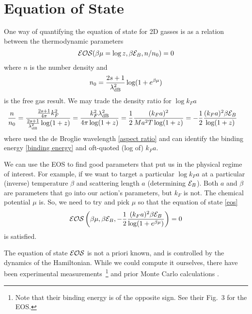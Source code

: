 \section{Equation of State}\label{sec:eos}

One way of quantifying the equation of state for 2D gasses is as a relation between the thermodynamic parameters
\begin{align}
    \mathcal{E}\mathcal{O}\mathcal{S}(\beta \mu = \log z, \beta \mathcal{E}_B, n/n_0) = 0
    \label{eq:eos}
\end{align}
where $n$ is the number density and 
\begin{align}
    n_0 = \frac{2s+1}{\lambda_{\text{dB}}^2} \log(1+e^{\beta\mu})
\end{align} is the free gas result.
We may trade the density ratio for $\log k_F a$
\begin{align}
    \frac{n}{n_0}
    &=
    \frac{\frac{2s+1}{4\pi} k_F^2}{\frac{2s+1}{\lambda_{\text{dB}}^2} \log(1+z)}
    =
    \frac{ k_F^2 \lambda_{\text{dB}}^2 }{4\pi \log(1+z)}
    =
    \frac{1}{2} \frac{ (k_Fa)^2 }{ Ma^2 T \log(1+z)}
    =
    -\frac{1}{2} \frac{(k_F a)^2 \beta\mathcal{E}_B }{\log(1+z)}
\end{align}
where used the de Broglie wavelength \eqref{aspect ratio} and can identify the binding energy \eqref{binding energy} and oft-quoted (log of) $k_F a$.

We can use the EOS to find good parameters that put us in the physical regime of interest.
For example, if we want to target a particular $\log k_F a$ at a particular (inverse) temperature $\beta$ and scattering length $a$ (determining $\mathcal{E}_B$).
Both $a$ and $\beta$ are parameters that go into our action's parameters, but $k_F$ is not.
The chemical potential $\mu$ is.
So, we need to try and pick $\mu$ so that the equation of state \eqref{eos}
\begin{align}
    \mathcal{E}\mathcal{O}\mathcal{S}\left(\beta \mu, \beta \mathcal{E}_B, - \frac{1}{2} \frac{ (k_Fa)^2 \beta \mathcal{E}_B}{ \log(1+e^{\beta \mu}) } \right) = 0
\end{align}
is satisfied.

The equation of state $\mathcal{E}\mathcal{O}\mathcal{S}$ is not a priori known, and is controlled by the dynamics of the Hamiltonian.
While we could compute it ourselves, there have been experimental measurements~\cite{PhysRevLett.116.045303}\footnote{Note that their binding energy is of the opposite sign.  See their Fig.~3 for the EOS.} and prior Monte Carlo calculations \cite{Anderson:2015uqa}.

